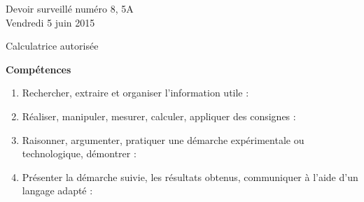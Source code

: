 \documentclass[a4paper,10pt]{article}
\begin{document}







\begin{feuilleDS}{Devoir surveillé numéro 8, 5A\\ \small Vendredi  5 juin 2015}
    \begin{center}
        Calculatrice autorisée
    \end{center}
\vspace{1cm}


{\bf Compétences}
\small
\begin{enumerate}
    \item
        Rechercher, extraire et organiser l'information utile :
    \item
        Réaliser, manipuler, mesurer, calculer, appliquer des consignes :
    \item
        Raisonner, argumenter, pratiquer une démarche expérimentale ou technologique, démontrer : 
    \item 
        Présenter la démarche suivie, les résultats obtenus, communiquer à l'aide d’un langage adapté : 
\end{enumerate}
\end{feuilleDS}
\end{document}
